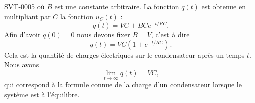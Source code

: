 \begin{corrige}{SVT-0005}
    où \( B\) est une constante arbitraire. La fonction \( q(t)\) est obtenue en multipliant par \( C\) la fonction \( u_C(t)\) :
    \begin{equation}
        q(t)=VC+BC e^{-t/RC}.
    \end{equation}
    Afin d'avoir \( q(0)=0\) nous devons fixer \( B=V\), c'est à dire 
    \begin{equation}
        q(t)=VC(1+ e^{-t/RC}).
    \end{equation}
    Cela est la quantité de charges électriques sur le condensateur après un temps \( t\). Nous avons
    \begin{equation}
        \lim_{t\to \infty} q(t)=VC,
    \end{equation}
    qui correspond à la formule connue de la charge d'un condensateur lorsque le système est à l'équilibre.

\end{corrige}

